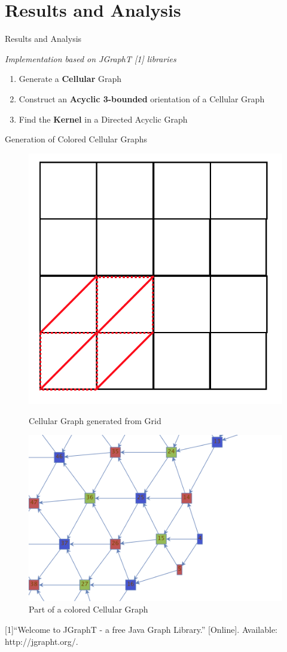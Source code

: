 \documentclass{beamer}
\begin{document}
\section{Results and Analysis}

\begin{frame}{Results and Analysis}

\small{\textit{Implementation based on JGraphT [1] libraries}}

\begin{block}{}

\begin{enumerate}
  \item Generate a \textbf{Cellular} Graph
  \item Construct an \textbf{Acyclic 3-bounded} orientation of a Cellular Graph
  \item Find the \textbf{Kernel} in a Directed Acyclic Graph
\end{enumerate}

\end{block}

\textrightarrow{}  Generation of Colored Cellular Graphs

\begin{figure}
\centering
\begin{minipage}{.5\textwidth}
  \centering
  \includegraphics[width=0.5\linewidth]{cellGeneration.png}
  \caption{Cellular Graph generated from Grid}
\end{minipage}%
\begin{minipage}{.5\textwidth}
  \centering
  \includegraphics[width=0.65\linewidth]{3colors.png}
  \caption{Part of a colored Cellular Graph}
\end{minipage}
\end{figure}

\scriptsize [1]“Welcome to JGraphT - a free Java Graph Library.” [Online]. Available: http://jgrapht.org/.
\end{frame}
\end{document}

